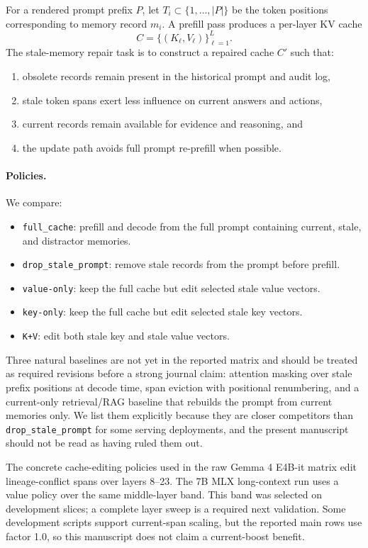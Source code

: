 \documentclass[11pt]{article}
\newcommand{\fullcache}{\texttt{full\_cache}}
\newcommand{\promptdelete}{\texttt{drop\_stale\_prompt}}
\newcommand{\valueedit}{\texttt{value-only}}
\newcommand{\keyedit}{\texttt{key-only}}
\newcommand{\kvedit}{\texttt{K+V}}
\newcommand{\gemma}{Gemma 4 E4B-it}
\begin{document}
For a rendered prompt prefix $P$, let $T_i \subset \{1,\ldots,|P|\}$ be the
token positions corresponding to memory record $m_i$. A prefill pass produces a
per-layer KV cache
\[
  C = \{(K_\ell, V_\ell)\}_{\ell=1}^{L}.
\]
The stale-memory repair task is to construct a repaired cache $C'$ such that:
\begin{enumerate}[leftmargin=1.5em]
  \item obsolete records remain present in the historical prompt and audit log,
  \item stale token spans exert less influence on current answers and actions,
  \item current records remain available for evidence and reasoning, and
  \item the update path avoids full prompt re-prefill when possible.
\end{enumerate}

\paragraph{Policies.}
We compare:
\begin{itemize}[leftmargin=1.5em]
  \item \fullcache: prefill and decode from the full prompt containing current,
  stale, and distractor memories.
  \item \promptdelete: remove stale records from the prompt before prefill.
  \item \valueedit: keep the full cache but edit selected stale value vectors.
  \item \keyedit: keep the full cache but edit selected stale key vectors.
  \item \kvedit: edit both stale key and stale value vectors.
\end{itemize}

Three natural baselines are not yet in the reported matrix and should be
treated as required revisions before a strong journal claim: attention masking
over stale prefix positions at decode time, span eviction with positional
renumbering, and a current-only retrieval/RAG baseline that rebuilds the prompt
from current memories only. We list them explicitly because they are closer
competitors than \promptdelete{} for some serving deployments, and the present
manuscript should not be read as having ruled them out.

The concrete cache-editing policies used in the raw \gemma{} matrix edit
lineage-conflict spans over layers 8--23. The 7B MLX long-context run uses a
value policy over the same middle-layer band. This band was selected on
development slices; a complete layer sweep is a required next validation. Some
development scripts support current-span scaling, but the reported main rows
use factor 1.0, so this manuscript does not claim a current-boost benefit.
\end{document}
